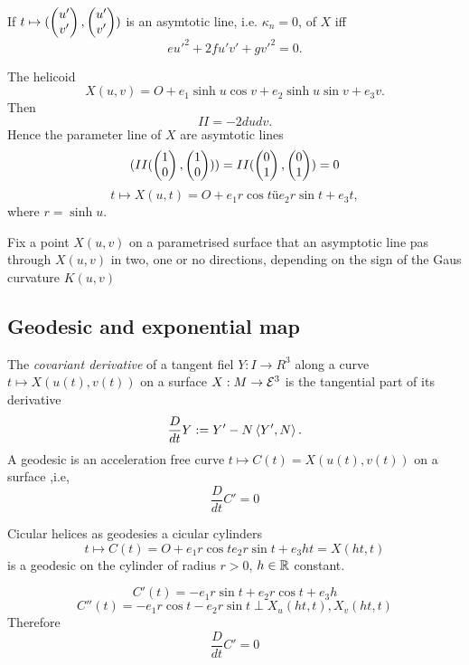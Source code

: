 \begin{corollary}
	If $t \mapsto (\begin{pmatrix} u'\\v' \end{pmatrix},\begin{pmatrix} u'\\v' \end{pmatrix})$ is an asymtotic line, i.e. $\kappa_n = 0$, of $X$ iff 
		\[ eu'^2 + 2fu'v' + gv'^2 = 0. \]
\end{corollary}

\begin{example}
	The helicoid
		\[ X(u,v) = O + e_1 \sinh u \cos v + e_2 \sinh u \sin v + e_3 v. \]
	Then
		\[ II = -2dudv. \]
	Hence the parameter line of $X$ are asymtotic lines 
		\[ (II(\begin{pmatrix} 1\\0 \end{pmatrix}, \begin{pmatrix} 1\\0 \end{pmatrix})) = II(\begin{pmatrix} 0\\1 \end{pmatrix}, \begin{pmatrix} 0\\1 \end{pmatrix}) = 0 \]
		\[ t \mapsto X(u,t) = O + e_1r \cos t ü e_2 r \sin t + e_3 t, \]
	where $r=\sinh u$.
\end{example}

\begin{lemma}
	Fix a point $X(u,v)$ on a parametrised surface that an asymptotic line pas through $X(u,v)$  in two, one or no directions, depending on the sign of the Gaus curvature $K(u,v)$
\end{lemma}

\subsection{Geodesic and exponential map}

\begin{definition}
	The \emph{covariant derivative} of a tangent fiel $Y: I \to R^3$ along a curve $t \mapsto X(u(t),v(t))$ on a surface $X:M \to \mathcal E^3$ is the tangential part of its derivative 
		\[ \frac {D}{dt} Y : = Y' - N \left \langle Y',N \right\rangle.  \]
	A geodesic is an acceleration free curve $t \mapsto C(t)=X(u(t),v(t))$ on a surface ,i.e,
		\[ \frac D{dt} C' = 0 \]
\end{definition}

\begin{example}
	Cicular helices as geodesies a cicular cylinders
		\[ t \mapsto C(t)= O+ e_1 r \cos t e_2 r\sin t + e_3 h t = X(ht,t)  \]
	is a geodesic on the cylinder of radius $r>0$, $h\in \mathbb R$ constant.
	
		\[ C'(t) = -e_1 r\sin t + e_2 r \cos t +e_3 h \]
		\[ C''(t)= -e_1 r\cos t - e_2 r\sin t \perp X_u(ht,t), X_v(ht,t) \]
	Therefore
		\[ \frac D{dt} C' = 0 \]
\end{example}

